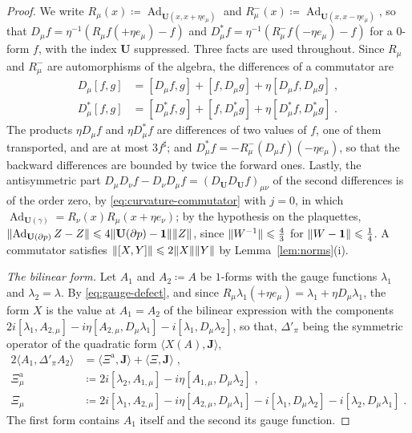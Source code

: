 \documentclass[11pt]{preprint}
\makeatletter
\newcommand{\id}{\mathbf 1}
\newcommand{\Ad}{\operatorname{Ad}}
\DeclarePairedDelimiter{\norm}{\lVert}{\rVert}
\newcommand*{\bigcdot}{}%
\DeclareRobustCommand*{\bigcdot}{%
	\mathbin{\mathpalette\bigcdot@{}}%
}
\newcommand*{\bigcdot@scalefactor}{.7}
\newcommand*{\bigcdot@widthfactor}{1.15}
\newcommand*{\bigcdot@}[2]{%
	\sbox0{$#1\vcenter{}$}%
	\sbox2{$#1\cdot\m@th$}%
	\hbox to \bigcdot@widthfactor\wd2{%
		\hss
		\raise\ht0\hbox{%
			\scalebox{\bigcdot@scalefactor}{%
				\lower\ht0\hbox{$#1\bullet\m@th$}%
			}%
		}%
		\hss
	}%
}
\numberwithin{equation}{section}
\makeatother
\begin{document}
\begin{proof}
We write $R_\mu(x) \coloneqq \Ad_{\mathbf U(x, x + \eta e_\mu)}$ and $R^-_\mu(x) \coloneqq \Ad_{\mathbf U(x, x - \eta e_\mu)}$, so that $D_\mu f = \eta^{-1}(R_\mu f(\bigcdot +\eta e_\mu) - f)$ and $D^*_\mu f = \eta^{-1}(R^-_\mu f(\bigcdot -\eta e_\mu) - f)$ for a $0$-form $f$, with the index $\mathbf U$ suppressed. Three facts are used throughout. Since $R_\mu$ and $R^-_\mu$ are automorphisms of the algebra, the differences of a commutator are
\begin{equation}\label{eq:leibniz}
\begin{aligned}
    D_\mu[f, g] &= [D_\mu f, g] + [f, D_\mu g] + \eta[D_\mu f, D_\mu g]\;,\\
    D^*_\mu[f, g] &= [D^*_\mu f, g] + [f, D^*_\mu g] + \eta[D^*_\mu f, D^*_\mu g]\;.
\end{aligned}
\end{equation}
The products $\eta D_\mu f$ and $\eta D^*_\mu f$ are differences of two values of $f$, one of them transported, and are at most $3f^\sharp$; and $D^*_\mu f = -R^-_\mu(D_\mu f)(\bigcdot -\eta e_\mu)$, so that the backward differences are bounded by twice the forward ones. Lastly, the antisymmetric part $D_\mu D_\nu f - D_\nu D_\mu f = (D_{\mathbf U}D_{\mathbf U}f)_{\mu\nu}$ of the second differences is of the order zero, by \eqref{eq:curvature-commutator} with $j = 0$, in which $\Ad_{\mathbf U(\gamma)} = R_\nu(x)R_\mu(x + \eta e_\nu)$; by the hypothesis on the plaquettes, $\norm{\Ad_{\mathbf U(\partial p)}Z - Z} \leqslant 4\norm{\mathbf U(\partial p) - \id}\norm Z$, since $\norm{W^{-1}} \leqslant \frac{4}{3}$ for $\norm{W - \id} \leqslant \frac{1}{4}$. A commutator satisfies $\norm{[X, Y]} \leqslant 2\norm X\norm Y$ by Lemma~\ref{lem:norms}(i).

\emph{The bilinear form.} Let $A_1$ and $A_2 \coloneqq A$ be $1$-forms with the gauge functions $\lambda_1$ and $\lambda_2 = \lambda$. By \eqref{eq:gauge-defect}, and since $R_\mu\lambda_1(\bigcdot +\eta e_\mu) = \lambda_1 + \eta D_\mu\lambda_1$, the form $X$ is the value at $A_1 = A_2$ of the bilinear expression with the components $2i[\lambda_1, A_{2,\mu}] - i\eta[A_{2,\mu}, D_\mu\lambda_1] - i[\lambda_1, D_\mu\lambda_2]$, so that, $\Delta'_\pi$ being the symmetric operator of the quadratic form $\langle X(A), \mathbf J\rangle$,
\begin{equation}\label{eq:vertex-polarised}
\begin{aligned}
    2\langle A_1, \Delta'_\pi A_2\rangle &= \langle\Xi^{\mathrm a}, \mathbf J\rangle + \langle\Xi, \mathbf J\rangle\;,\\
    \Xi^{\mathrm a}_\mu &\coloneqq 2i[\lambda_2, A_{1,\mu}] - i\eta[A_{1,\mu}, D_\mu\lambda_2]\;,\\
    \Xi_\mu &\coloneqq 2i[\lambda_1, A_{2,\mu}] - i\eta[A_{2,\mu}, D_\mu\lambda_1] - i[\lambda_1, D_\mu\lambda_2] - i[\lambda_2, D_\mu\lambda_1]\;.
\end{aligned}
\end{equation}
The first form contains $A_1$ itself and the second its gauge function.


\end{proof}
\end{document}
